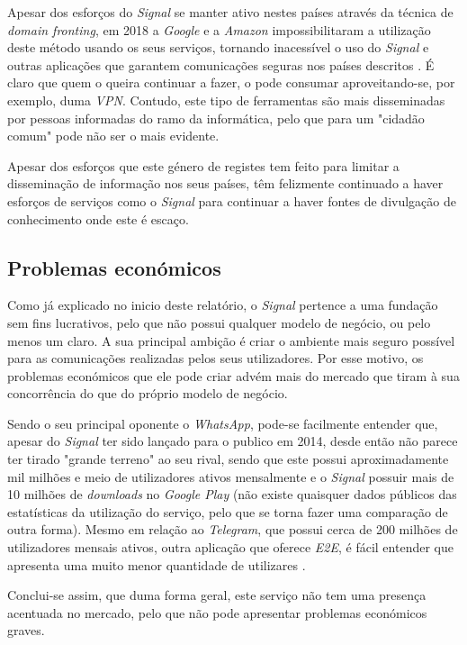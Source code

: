 Apesar dos esforços do \textit{Signal} se manter ativo nestes países através da técnica de \textit{domain fronting}, em 2018 a \textit{Google} e a \textit{Amazon} impossibilitaram a utilização deste método usando os seus serviços, tornando inacessível o uso do \textit{Signal} e outras aplicações que garantem comunicações seguras nos países descritos \cite{signal_amazon_letter}. É claro que quem o queira continuar a fazer, o pode consumar aproveitando-se, por exemplo, duma \textit{VPN}. Contudo, este tipo de ferramentas são mais disseminadas por pessoas informadas do ramo da informática, pelo que para um "cidadão comum" pode não ser o mais evidente.

Apesar dos esforços que este género de registes tem feito para limitar a disseminação de informação nos seus países, têm felizmente continuado a haver esforços de serviços como o \textit{Signal} para continuar a haver fontes de divulgação de conhecimento onde este é escaço.


\subsection{Problemas económicos}
Como já explicado no inicio deste relatório, o \textit{Signal} pertence a uma fundação sem fins lucrativos, pelo que não possui qualquer modelo de negócio, ou pelo menos um claro. A sua principal ambição é criar o ambiente mais seguro possível para as comunicações realizadas pelos seus utilizadores. Por esse motivo, os problemas económicos que ele pode criar advém mais do mercado que tiram à sua concorrência do que do próprio modelo de negócio.

Sendo o seu principal oponente o \textit{WhatsApp}, pode-se facilmente entender que, apesar do \textit{Signal} ter sido lançado para o publico em 2014, desde então não parece ter tirado "grande terreno" ao seu rival, sendo que este possui aproximadamente mil milhões e meio de utilizadores ativos mensalmente e o \textit{Signal} possuir mais de 10 milhões de \textit{downloads} no \textit{Google Play} (não existe quaisquer dados públicos das estatísticas da utilização do serviço, pelo que se torna fazer uma comparação de outra forma). Mesmo em relação ao \textit{Telegram}, que possui cerca de 200 milhões de utilizadores mensais ativos, outra aplicação que oferece \textit{E2E}, é fácil entender que apresenta uma muito menor quantidade de utilizares \cite{other_apps_statistics}. 

Conclui-se assim, que duma forma geral, este serviço não tem uma presença acentuada no mercado, pelo que não pode apresentar problemas económicos graves.

